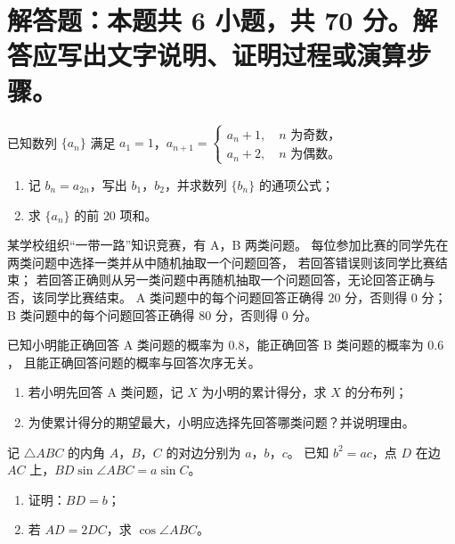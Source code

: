 \documentclass{exam-zh}
\begin{document}
\section{解答题：本题共 6 小题，共 70 分。解答应写出文字说明、证明过程或演算步骤。}

\begin{problem}[points = 10]
  已知数列 $\{a_n\}$ 满足 $a_1 = 1$，$a_{n+1} =
    \begin{cases}
      a_n + 1, \quad \text{$n$ 为奇数，} \\
      a_n + 2, \quad \text{$n$ 为偶数。}
    \end{cases}$
  \begin{enumerate}
    \item 记 $b_n = a_{2n}$，写出 $b_1$，$b_2$，并求数列 $\{b_n\}$ 的通项公式；
    \item 求 $\{a_n\}$ 的前 $20$ 项和。
  \end{enumerate}
\end{problem}

\begin{problem}[points = 12]
  某学校组织“一带一路”知识竞赛，有 A，B 两类问题。
  每位参加比赛的同学先在两类问题中选择一类并从中随机抽取一个问题回答，
  若回答错误则该同学比赛结束；
  若回答正确则从另一类问题中再随机抽取一个问题回答，无论回答正确与否，该同学比赛结束。
  A 类问题中的每个问题回答正确得 $20$ 分，否则得 $0$ 分；
  B 类问题中的每个问题回答正确得 $80$ 分，否则得 $0$ 分。

  已知小明能正确回答 A 类问题的概率为 $0.8$，能正确回答 B 类问题的概率为 $0.6$，
  且能正确回答问题的概率与回答次序无关。
  \begin{enumerate}
    \item 若小明先回答 A 类问题，记 $X$ 为小明的累计得分，求 $X$ 的分布列；
    \item 为使累计得分的期望最大，小明应选择先回答哪类问题？并说明理由。
  \end{enumerate}
\end{problem}

\begin{problem}[points = 12]
  记 $\triangle ABC$ 的内角 $A$，$B$，$C$ 的对边分别为 $a$，$b$，$c$。
  已知 $b^2 = ac$，点 $D$ 在边 $AC$ 上，$BD \sin\angle ABC = a \sin C$。
  \nopagebreak
  \begin{enumerate}
    \item 证明：$BD = b$；
    \item 若 $AD = 2 DC$，求 $\cos\angle ABC$。
  \end{enumerate}
\end{problem}
\end{document}
